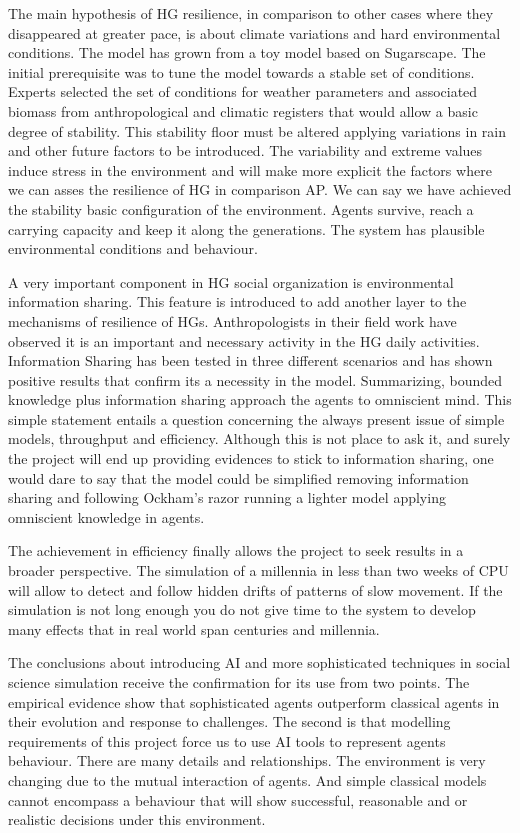 \documentclass[11pt,oneside,a4paper,openright]{report}
\begin{document}
The main hypothesis of HG resilience, in comparison to other cases where they disappeared at 
greater pace, is about climate variations and hard environmental conditions.
The model has grown from a toy model based on Sugarscape\cite{EpsteinAxtell}. The initial prerequisite
was to tune the model towards a stable set of conditions. Experts selected the set of conditions 
for weather parameters and associated biomass from anthropological and climatic registers that would 
allow a basic degree of stability. This stability floor must be altered applying variations in rain and
other future factors to be introduced. The variability and extreme values induce stress in the 
environment and will make more explicit the factors where we can asses the resilience of HG in comparison AP. We can say we have achieved the stability basic configuration of the environment. Agents survive, reach a carrying capacity and keep it along the generations. The system has plausible environmental conditions and behaviour.

A very important component in HG social organization is environmental information sharing. This feature
is introduced to add another layer to the mechanisms of resilience of HGs. Anthropologists in their
field work have observed it is an important and necessary activity in the HG daily activities. 
Information Sharing has been tested in three different scenarios and has shown positive results that
confirm its a necessity in the model. Summarizing, bounded knowledge plus information sharing approach 
the agents to omniscient mind. This simple statement entails a question concerning the always present issue 
of simple models, throughput and efficiency. Although this is not place to ask it, and surely the project will end up providing evidences to stick to information sharing, one would dare to say that the model could be simplified
removing information sharing and following Ockham's razor running a lighter model applying omniscient
knowledge in agents.

The achievement in efficiency finally allows the project to seek results in a broader perspective. The 
simulation of a millennia in less than two weeks of CPU will allow to detect and follow hidden drifts of patterns
of slow movement. If the simulation is not long enough you do not give time to the system to develop many
effects that in real world span centuries and millennia.

The conclusions about introducing AI and more sophisticated techniques in social science simulation receive
the confirmation for its use from two points. The empirical evidence show that sophisticated agents outperform
classical agents in their evolution and response to challenges. The second is that modelling requirements of this 
project force us to use AI tools to represent agents behaviour. There are many details and relationships.
The environment is very changing due to the mutual interaction of agents. And simple classical models cannot 
encompass a behaviour that will show successful, reasonable and or realistic decisions under this environment.
\end{document}
